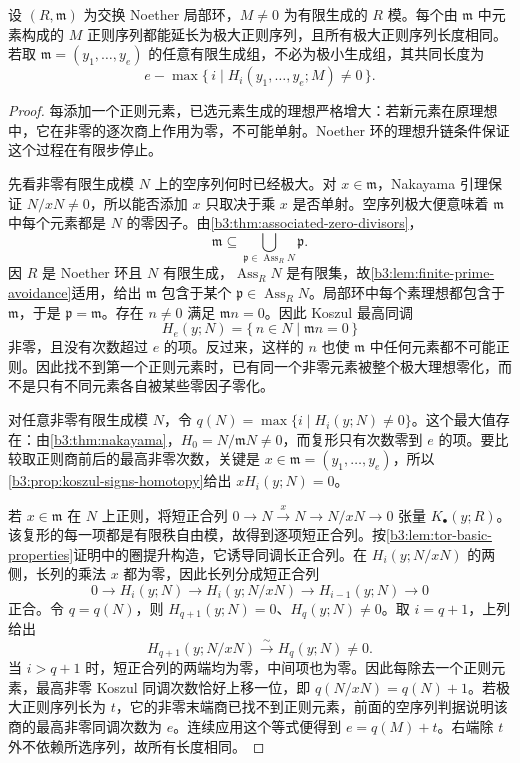 \begin{theorem}\label{b3:thm:maximal-regular-length}
	设 \((R,\mathfrak m)\) 为交换 Noether 局部环，\(M\ne0\) 为有限生成的 \(R\) 模。每个由 \(\mathfrak m\) 中元素构成的 \(M\) 正则序列都能延长为极大正则序列，且所有极大正则序列长度相同。若取 \(\mathfrak m=(y_1,\ldots,y_e)\) 的任意有限生成组，不必为极小生成组，其共同长度为
	\[
		e-\max\{\,i\mid H_i(y_1,\ldots,y_e;M)\ne0\,\}.
	\]
\end{theorem}
\begin{proof}
	每添加一个正则元素，已选元素生成的理想严格增大：若新元素在原理想中，它在非零的逐次商上作用为零，不可能单射。Noether 环的理想升链条件保证这个过程在有限步停止。

	先看非零有限生成模 \(N\) 上的空序列何时已经极大。对 \(x\in\mathfrak m\)，Nakayama 引理保证 \(N/xN\ne0\)，所以能否添加 \(x\) 只取决于乘 \(x\) 是否单射。空序列极大便意味着 \(\mathfrak m\) 中每个元素都是 \(N\) 的零因子。由\cref{b3:thm:associated-zero-divisors}，
	\[
		\mathfrak m\subseteq\bigcup_{\mathfrak p\in\operatorname{Ass}_RN}\mathfrak p.
	\]
	因 \(R\) 是 Noether 环且 \(N\) 有限生成，\(\operatorname{Ass}_RN\) 是有限集，故\cref{b3:lem:finite-prime-avoidance}适用，给出 \(\mathfrak m\) 包含于某个 \(\mathfrak p\in\operatorname{Ass}_RN\)。局部环中每个素理想都包含于 \(\mathfrak m\)，于是 \(\mathfrak p=\mathfrak m\)。存在 \(n\ne0\) 满足 \(\mathfrak mn=0\)。因此 Koszul 最高同调
	\[
		H_e(y;N)=\{\,n\in N\mid\mathfrak mn=0\,\}
	\]
	非零，且没有次数超过 \(e\) 的项。反过来，这样的 \(n\) 也使 \(\mathfrak m\) 中任何元素都不可能正则。因此找不到第一个正则元素时，已有同一个非零元素被整个极大理想零化，而不是只有不同元素各自被某些零因子零化。

	对任意非零有限生成模 \(N\)，令 \(q(N)=\max\{i\mid H_i(y;N)\ne0\}\)。这个最大值存在：由\cref{b3:thm:nakayama}，\(H_0=N/\mathfrak mN\ne0\)，而复形只有次数零到 \(e\) 的项。要比较取正则商前后的最高非零次数，关键是 \(x\in\mathfrak m=(y_1,\ldots,y_e)\)，所以\cref{b3:prop:koszul-signs-homotopy}给出 \(xH_i(y;N)=0\)。

	若 \(x\in\mathfrak m\) 在 \(N\) 上正则，将短正合列 \(0\rightarrow N\xrightarrow{x}N\rightarrow N/xN\rightarrow0\) 张量 \(K_\bullet(y;R)\)。该复形的每一项都是有限秩自由模，故得到逐项短正合列。按\cref{b3:lem:tor-basic-properties}证明中的圈提升构造，它诱导同调长正合列。在 \(H_i(y;N/xN)\) 的两侧，长列的乘法 \(x\) 都为零，因此长列分成短正合列
	\[
		0\longrightarrow H_i(y;N)\longrightarrow H_i(y;N/xN) \longrightarrow H_{i-1}(y;N)\longrightarrow0
	\]
	正合。令 \(q=q(N)\)，则 \(H_{q+1}(y;N)=0\)、\(H_q(y;N)\ne0\)。取 \(i=q+1\)，上列给出
	\[
		H_{q+1}(y;N/xN)\xrightarrow{\sim}H_q(y;N)\ne0.
	\]
	当 \(i>q+1\) 时，短正合列的两端均为零，中间项也为零。因此每除去一个正则元素，最高非零 Koszul 同调次数恰好上移一位，即 \(q(N/xN)=q(N)+1\)。若极大正则序列长为 \(t\)，它的非零末端商已找不到正则元素，前面的空序列判据说明该商的最高非零同调次数为 \(e\)。连续应用这个等式便得到 \(e=q(M)+t\)。右端除 \(t\) 外不依赖所选序列，故所有长度相同。
\end{proof}

